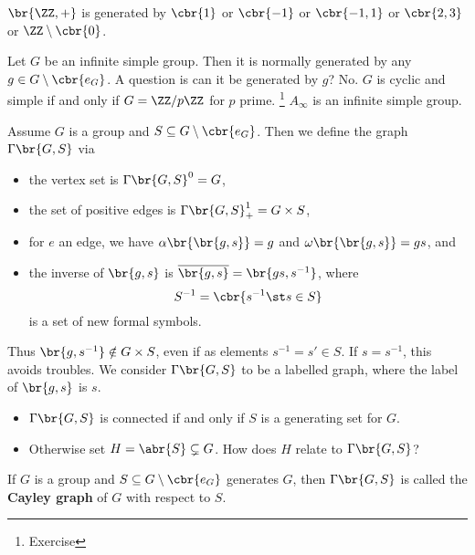 \begin{example}
$ \br{\ZZ, +} $ is generated by $ \cbr{1} $ or $ \cbr{-1} $ or $ \cbr{-1, 1} $ or $ \cbr{2, 3} $ or $ \ZZ \setminus \cbr{0} $.
\end{example}

\pagebreak

\begin{example}
Let $ G $ be an infinite simple group. Then it is normally generated by any $ g \in G \setminus \cbr{e_G} $. A question is can it be generated by $ g $? No. $ G $ is cyclic and simple if and only if $ G = \ZZ / p\ZZ $ for $ p $ prime. \footnote{Exercise} $ A_\infty $ is an infinite simple group.
\end{example}


\begin{definition}
Assume $ G $ is a group and $ S \subseteq G \setminus \cbr{e_G} $. Then we define the graph $ \Gamma\br{G, S} $ via
\begin{itemize}
\item the vertex set is $ \Gamma\br{G, S}^0 = G $,
\item the set of positive edges is $ \Gamma\br{G, S}_+^1 = G \times S $,
\item for $ e $ an edge, we have $ \alpha\br{\br{g, s}} = g $ and $ \omega\br{\br{g, s}} = gs $, and
\item the inverse of $ \br{g, s} $ is $ \overline{\br{g, s}} = \br{gs, s^{-1}} $, where
$$ S^{-1} = \cbr{s^{-1} \st s \in S} $$
is a set of new formal symbols.
\end{itemize}
Thus $ \br{g, s^{-1}} \notin G \times S $, even if as elements $ s^{-1} = s' \in S $. If $ s = s^{-1} $, this avoids troubles. We consider $ \Gamma\br{G, S} $ to be a labelled graph, where the label of $ \br{g, s} $ is $ s $.
\end{definition}

\begin{exercise}
\hfill
\begin{itemize}
\item $ \Gamma\br{G, S} $ is connected if and only if $ S $ is a generating set for $ G $.
\item Otherwise set $ H = \abr{S} \subsetneq G $. How does $ H $ relate to $ \Gamma\br{G, S} $?
\end{itemize}
\end{exercise}

\begin{definition}
If $ G $ is a group and $ S \subseteq G \setminus \cbr{e_G} $ generates $ G $, then $ \Gamma\br{G, S} $ is called the \textbf{Cayley graph} of $ G $ with respect to $ S $.
\end{definition}

